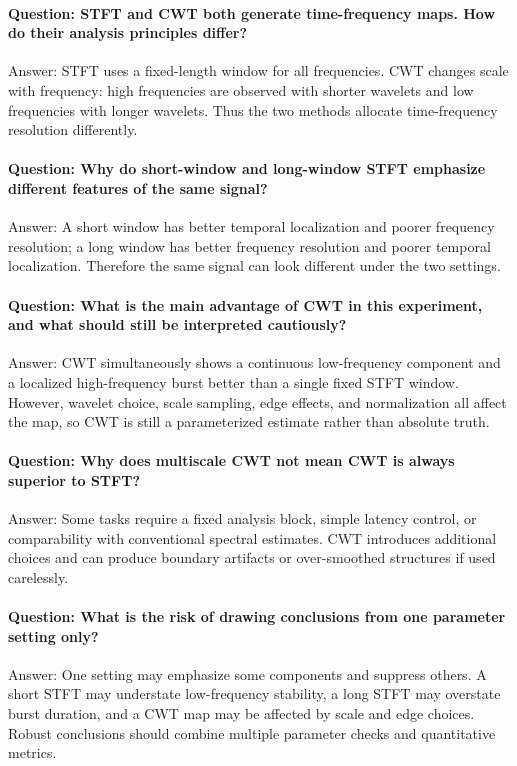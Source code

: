 \documentclass[a4paper,11pt]{article}
\numberwithin{equation}{section}
\begin{document}
\paragraph{Question: STFT and CWT both generate time-frequency maps. How do their analysis principles differ?}
Answer: STFT uses a fixed-length window for all frequencies. CWT changes scale with frequency: high frequencies are observed with shorter wavelets and low frequencies with longer wavelets. Thus the two methods allocate time-frequency resolution differently.

\paragraph{Question: Why do short-window and long-window STFT emphasize different features of the same signal?}
Answer: A short window has better temporal localization and poorer frequency resolution; a long window has better frequency resolution and poorer temporal localization. Therefore the same signal can look different under the two settings.

\paragraph{Question: What is the main advantage of CWT in this experiment, and what should still be interpreted cautiously?}
Answer: CWT simultaneously shows a continuous low-frequency component and a localized high-frequency burst better than a single fixed STFT window. However, wavelet choice, scale sampling, edge effects, and normalization all affect the map, so CWT is still a parameterized estimate rather than absolute truth.

\paragraph{Question: Why does multiscale CWT not mean CWT is always superior to STFT?}
Answer: Some tasks require a fixed analysis block, simple latency control, or comparability with conventional spectral estimates. CWT introduces additional choices and can produce boundary artifacts or over-smoothed structures if used carelessly.

\paragraph{Question: What is the risk of drawing conclusions from one parameter setting only?}
Answer: One setting may emphasize some components and suppress others. A short STFT may understate low-frequency stability, a long STFT may overstate burst duration, and a CWT map may be affected by scale and edge choices. Robust conclusions should combine multiple parameter checks and quantitative metrics.
\end{document}
